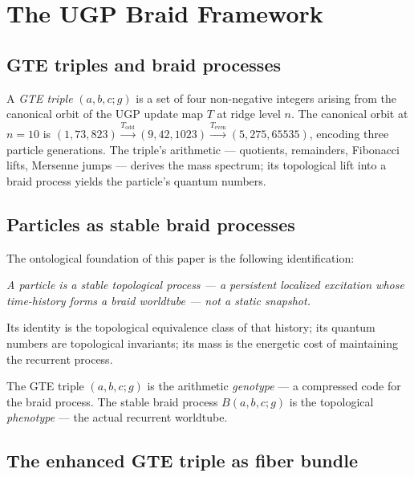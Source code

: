 \documentclass[12pt]{article}
\theoremstyle{remark}
\begin{document}
\section{The UGP Braid Framework}
\label{sec:framework}

\subsection{GTE triples and braid processes}

A \emph{GTE triple} $(a,b,c;g)$ is a set of four non-negative integers arising
from the canonical orbit of the UGP update map $T$ at ridge level $n$.  The
canonical orbit at $n = 10$ is $(1,73,823) \xrightarrow{T_\text{odd}}
(9,42,1023) \xrightarrow{T_\text{even}} (5,275,65535)$, encoding three
particle generations.  The triple's arithmetic --- quotients, remainders,
Fibonacci lifts, Mersenne jumps --- derives the mass spectrum; its topological
lift into a braid process yields the particle's quantum numbers.

\subsection{Particles as stable braid processes}

The ontological foundation of this paper is the following identification:
\begin{tcolorbox}[colback=gray!8,colframe=black!60]
\emph{A particle is a stable topological process --- a persistent localized
excitation whose time-history forms a braid worldtube --- not a static snapshot.}
\end{tcolorbox}

Its identity is the topological equivalence class of that history; its quantum
numbers are topological invariants; its mass is the energetic cost of
maintaining the recurrent process.

The GTE triple $(a,b,c;g)$ is the arithmetic \emph{genotype} --- a compressed
code for the braid process.  The stable braid process $B(a,b,c;g)$ is the
topological \emph{phenotype} --- the actual recurrent worldtube.

\subsection{The enhanced GTE triple as fiber bundle}
\end{document}
